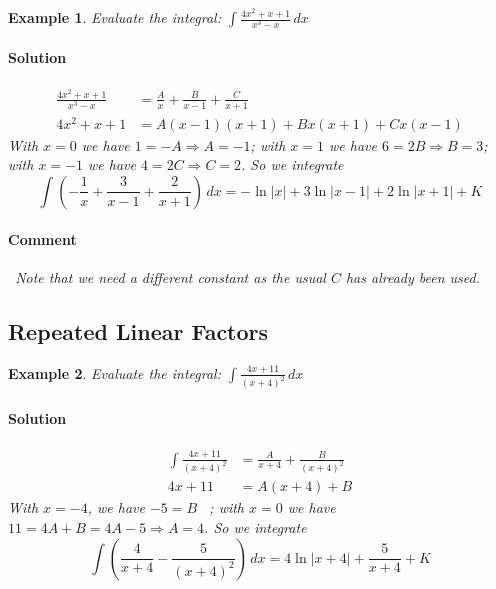 \documentclass[letterpaper, 11pt, openany]{book}
\theoremstyle{mytheoremstyle}
\theoremstyle{myexamplestyle}
\newtheorem{example}{Example}[section]
\newenvironment{solution}{\paragraph{\sffamily \smaller \fontseries{b}\selectfont Solution}}{\hfill\faSquare}
\newenvironment{commentary}{\paragraph{\sffamily \smaller \fontseries{b}\selectfont Comment}}{}
\begin{document}
\begin{example}\label{e:parfracdlin2}
    Evaluate the integral: $\displaystyle \int \frac{4x^{2} + x + 1}{x^{3} - x} \, dx$
    
    \begin{solution}
        \begin{align*}
            \frac{4x^{2} + x + 1}{x^{3} - x} &= \frac{A}{x} + \frac{B}{x-1} + \frac{C}{x+1}\\[2ex]
            4x^{2} + x + 1 &= A(x-1)(x+1) + Bx(x+1) + Cx(x-1)
        \end{align*}
        With $x = 0$ we have $1 = -A \Rightarrow A = -1$; with $x=1$ we have $6 = 2B \Rightarrow B = 3$; with $x = -1$ we have $4 = 2C \Rightarrow C = 2$. So we integrate
        \[\int \left( -\frac{1}{x} + \frac{3}{x-1} + \frac{2}{x+1} \right)\, dx = -\ln |x| + 3\ln |x - 1| + 2\ln |x + 1| + K\]
    \end{solution}    
    \begin{commentary}
        \faExclamationTriangle[solid] \ Note that we need a different constant as the usual $C$ has already been used.
    \end{commentary}
    \end{example}

\subsection{Repeated Linear Factors}
\begin{example}\label{e:parfracreplin}
    Evaluate the integral: $\displaystyle \int \frac{4x + 11}{(x + 4)^{2}} \, dx$
    
    \begin{solution}
        \begin{align*}
            \int \frac{4x + 11}{(x + 4)^{2}} &= \frac{A}{x + 4} + \frac{B}{(x + 4)^{2}}\\[2ex]
            4x + 11 &= A(x+4) + B
        \end{align*}
        With $x = -4$, we have $-5 = B$ \faSmile \ ; with $x = 0$ we have $11 = 4A + B = 4A - 5 \Rightarrow A = 4$. So we integrate
        \[\int \left( \frac{4}{x + 4} - \frac{5}{(x + 4)^{2}} \right) \, dx = 4\ln |x + 4| + \frac{5}{x  + 4} + K\]
    \end{solution}
\end{example}
\end{document}
